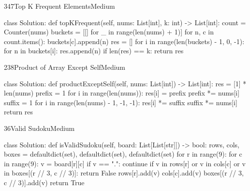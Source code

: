 \begin{problem}{347}{Top K Frequent Elements}{Medium}
\begin{code}
class Solution:
    def topKFrequent(self, nums: List[int], k: int) -> List[int]:
        count = Counter(nums)
        buckets = [[] for _ in range(len(nums) + 1)]
        for n, c in count.items():
            buckets[c].append(n)
        res = []
        for i in range(len(buckets) - 1, 0, -1):
            for n in buckets[i]:
                res.append(n)
                if len(res) == k:
                    return res
\end{code}
\end{problem}

\begin{problem}{238}{Product of Array Except Self}{Medium}
\begin{code}
class Solution:
    def productExceptSelf(self, nums: List[int]) -> List[int]:
        res = [1] * len(nums)
        prefix = 1
        for i in range(len(nums)):
            res[i] = prefix
            prefix *= nums[i]
        suffix = 1
        for i in range(len(nums) - 1, -1, -1):
            res[i] *= suffix
            suffix *= nums[i]
        return res
\end{code}
\end{problem}

\begin{problem}{36}{Valid Sudoku}{Medium}
\begin{code}
class Solution:
    def isValidSudoku(self, board: List[List[str]]) -> bool:
        rows, cols, boxes = defaultdict(set), defaultdict(set), defaultdict(set)
        for r in range(9):
            for c in range(9):
                v = board[r][c]
                if v == ".":
                    continue
                if v in rows[r] or v in cols[c] or v in boxes[(r // 3, c // 3)]:
                    return False
                rows[r].add(v)
                cols[c].add(v)
                boxes[(r // 3, c // 3)].add(v)
        return True
\end{code}
\end{problem}

